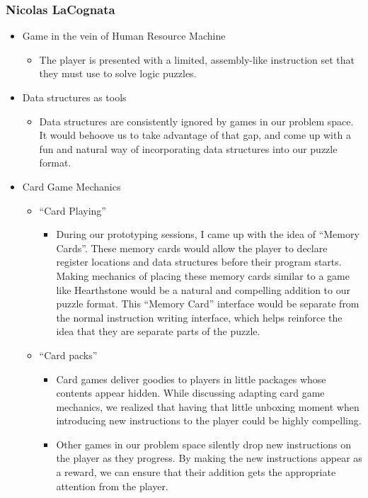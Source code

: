 \subsubsection{Nicolas LaCognata}
\begin{itemize}
  \item Game in the vein of Human Resource Machine
  \begin{itemize}
    \item The player is presented with a limited, assembly-like instruction set
    that they must use to solve logic puzzles.
  \end{itemize}
  \item Data structures as tools
  \begin{itemize}
    \item Data structures are consistently ignored by games in our problem
    space. It would behoove us to take advantage of that gap, and come up with a
    fun and natural way of incorporating data structures into our puzzle format.
  \end{itemize}
  \item Card Game Mechanics
  \begin{itemize}
    \item “Card Playing”
    \begin{itemize}
      \item During our prototyping sessions, I came up with the idea of “Memory
      Cards”. These memory cards would allow the player to declare register
      locations and data structures before their program starts. Making
      mechanics of placing these memory cards similar to a game like Hearthstone
      would be a natural and compelling addition to our puzzle format. This
      “Memory Card” interface would be separate from the normal instruction
      writing interface, which helps reinforce the idea that they are separate
      parts of the puzzle.
    \end{itemize}
    \item “Card packs”
    \begin{itemize}
      \item Card games deliver goodies to players in little packages whose
      contents appear hidden. While discussing adapting card game mechanics, we
      realized that having that little unboxing moment when introducing new
      instructions to the player could be highly compelling.
      \item Other games in our problem space silently drop new instructions on
      the player as they progress. By making the new instructions appear as a
      reward, we can ensure that their addition gets the appropriate attention
      from the player.
    \end{itemize}
  \end{itemize}
\end{itemize}

